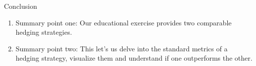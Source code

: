 \documentclass[aspectratio=169,11pt]{beamer}
\begin{document}





\begin{frame}{Conclusion}
    \begin{enumerate}
        \item Summary point one: Our educational exercise provides two comparable hedging strategies.
        
        \item Summary point two: This let's us delve into the standard metrics of a hedging strategy, visualize them and understand if one outperforms the other.
    \end{enumerate}
\end{frame}
\end{document}
